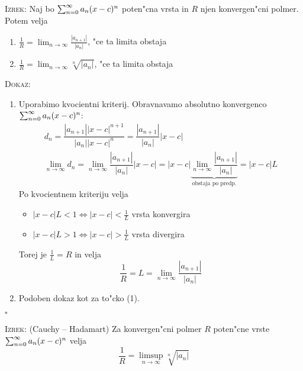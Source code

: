\textsc{Izrek:} Naj bo $\sum_{n = 0}^{\infty} a_n (x - c)^n$ poten"cna vrsta in $R$ njen konvergen"cni polmer. Potem velja
\begin{enumerate}
    \item $\frac{1}{R} = \lim_{n \to \infty} \frac{|a_{n+1}|}{|a_n|}$, "ce ta limita obstaja
    \item $\frac{1}{R} = \lim_{n \to \infty} \sqrt[n]{|a_n|}$, "ce ta limita obstaja
\end{enumerate}
\textsc{Dokaz:}
\begin{enumerate}
    \item Uporabimo kvocientni kriterij. Obravnavamo absolutno konvergenco $\sum_{n = 0}^{\infty} a_n (x - c)^n$:
    \begin{gather*}
    d_n = \dfrac{|a_{n+1}| |x-c|^{n+1}}{|a_n| |x-c|^n} = \dfrac{|a_{n+1}|}{|a_n|} |x-c| \\
    \lim_{n \to \infty} d_n = \lim_{n \to \infty} \dfrac{|a_{n+1}|}{|a_n|} |x-c| = |x-c| \underbrace{\lim_{n \to \infty} \dfrac{|a_{n+1}|}{|a_n|}}_\text{obstaja po predp.} = |x-c| L
    \end{gather*}
    Po kvocientnem kriteriju velja
    \begin{itemize}
        \item $|x - c| L < 1 \iff | x - c| < \frac{1}{L}$ vrsta konvergira
        \item $|x - c| L > 1 \iff |x - c| > \frac{1}{L}$ vrsta divergira
    \end{itemize}
    Torej je $\frac{1}{L} = R$ in velja
    \begin{equation*}
    \dfrac{1}{R} = L = \lim_{n \to \infty} \dfrac{|a_{n+1}|}{|a_n|}
    \end{equation*}
    
    \item Podoben dokaz kot za to"cko (1).
\end{enumerate}
\hfill $\square$

\textsc{Izrek:} (Cauchy -- Hadamart) Za konvergen"cni polmer $R$ poten"cne vrste $\sum_{n = 0}^{\infty} a_n (x - c)^n$ velja
\begin{equation*}
\dfrac{1}{R} = \limsup_{n \to \infty} \sqrt[n]{|a_n|}
\end{equation*}